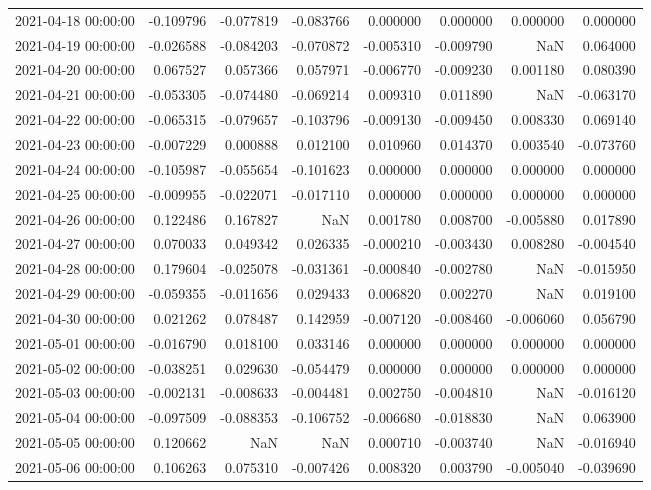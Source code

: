 \begin{tabular}{lrrrrrrr}
2021-04-18 00:00:00 & -0.109796 & -0.077819 & -0.083766 & 0.000000 & 0.000000 & 0.000000 & 0.000000 \\
2021-04-19 00:00:00 & -0.026588 & -0.084203 & -0.070872 & -0.005310 & -0.009790 & NaN & 0.064000 \\
2021-04-20 00:00:00 & 0.067527 & 0.057366 & 0.057971 & -0.006770 & -0.009230 & 0.001180 & 0.080390 \\
2021-04-21 00:00:00 & -0.053305 & -0.074480 & -0.069214 & 0.009310 & 0.011890 & NaN & -0.063170 \\
2021-04-22 00:00:00 & -0.065315 & -0.079657 & -0.103796 & -0.009130 & -0.009450 & 0.008330 & 0.069140 \\
2021-04-23 00:00:00 & -0.007229 & 0.000888 & 0.012100 & 0.010960 & 0.014370 & 0.003540 & -0.073760 \\
2021-04-24 00:00:00 & -0.105987 & -0.055654 & -0.101623 & 0.000000 & 0.000000 & 0.000000 & 0.000000 \\
2021-04-25 00:00:00 & -0.009955 & -0.022071 & -0.017110 & 0.000000 & 0.000000 & 0.000000 & 0.000000 \\
2021-04-26 00:00:00 & 0.122486 & 0.167827 & NaN & 0.001780 & 0.008700 & -0.005880 & 0.017890 \\
2021-04-27 00:00:00 & 0.070033 & 0.049342 & 0.026335 & -0.000210 & -0.003430 & 0.008280 & -0.004540 \\
2021-04-28 00:00:00 & 0.179604 & -0.025078 & -0.031361 & -0.000840 & -0.002780 & NaN & -0.015950 \\
2021-04-29 00:00:00 & -0.059355 & -0.011656 & 0.029433 & 0.006820 & 0.002270 & NaN & 0.019100 \\
2021-04-30 00:00:00 & 0.021262 & 0.078487 & 0.142959 & -0.007120 & -0.008460 & -0.006060 & 0.056790 \\
2021-05-01 00:00:00 & -0.016790 & 0.018100 & 0.033146 & 0.000000 & 0.000000 & 0.000000 & 0.000000 \\
2021-05-02 00:00:00 & -0.038251 & 0.029630 & -0.054479 & 0.000000 & 0.000000 & 0.000000 & 0.000000 \\
2021-05-03 00:00:00 & -0.002131 & -0.008633 & -0.004481 & 0.002750 & -0.004810 & NaN & -0.016120 \\
2021-05-04 00:00:00 & -0.097509 & -0.088353 & -0.106752 & -0.006680 & -0.018830 & NaN & 0.063900 \\
2021-05-05 00:00:00 & 0.120662 & NaN & NaN & 0.000710 & -0.003740 & NaN & -0.016940 \\
2021-05-06 00:00:00 & 0.106263 & 0.075310 & -0.007426 & 0.008320 & 0.003790 & -0.005040 & -0.039690 \\

\end{tabular}
